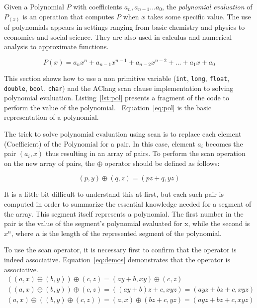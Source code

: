 \documentclass[Ingles]{ic-tese-v1}
\newcommand{\req}[1]{Equation~\ref{eq:#1}}
\newcommand{\ttt}[1]{{\texttt{#1}}}
\newcommand{\rlst}[1]{Listing~\ref{lst:#1}}
\begin{document}
Given a Polynomial $P$ with coefficients $a_{n}, a_{n-1} ... a_{0}$, the \textit{polynomial evaluation} of $P_{(x)}$ is an operation
that computes $P$ when $x$ takes some specific value. The use of polynomials
appears in settings ranging from basic chemistry and physics to economics and social science.
They are also used in calculus and numerical analysis to approximate  functions.

\begin{equation}
P(x) = a_{n}x^n + a_{n-1}x^{n-1} + a_{n-2}x^{n-2} + ... + a_{1}x + a_{0}
\label{eq:pol}
\end{equation}

This section shows how to use a non primitive variable (\ttt{int}, \ttt{long}, \ttt{float}, \ttt{double}, \ttt{bool}, \ttt{char})
and the AClang scan clause implementation to solving polynomial evaluation. \rlst{pol} presents
a fragment of the code to perform the value of the polynomial. ~\req{pol} is the basic
representation of a polynomial.

The trick to solve polynomial evaluation using scan is to replace each element (Coefficient) of the Polynomial for a pair. In this case,
element $a_{i}$ becomes the pair $(a_{i}, x)$ thus resulting in an array of pairs. To perform the scan operation on the new array of pairs,
the $\oplus$ operator should be defined  as follows:

\begin{equation}
(p, y) \oplus (q, z) = (p z + q, y z)
\label{eq:opepol}
\end{equation}

It is a little  bit difficult to understand this at first, but
each such pair is computed in order to summarize the essential knowledge needed for a
segment of the array. This segment itself represents a polynomial. The first
number in the pair is the value of the segment's polynomial evaluated for x,
while the second is $x^{n}$, where $n$ is the length of the represented segment
of the polynomial.

To use the scan operator, it is  necessary first to confirm that the operator is indeed associative.
\req{demos}  demonstrates that the operator is associative.
\begin{equation}
\begin{split}
((a, x) \oplus (b, y)) \oplus (c, z) = (a y + b, x y) \oplus (c, z) \\
((a, x) \oplus (b, y)) \oplus (c, z) = ((a y + b) z + c, x y z) = (a y z + b z + c, x y z)\\
(a, x) \oplus ((b, y) \oplus (c, z)) = (a, x) \oplus (b z + c, y z) = (a y z + b z + c, x y z)
\end{split}
\label{eq:demos}
\end{equation}
\end{document}
